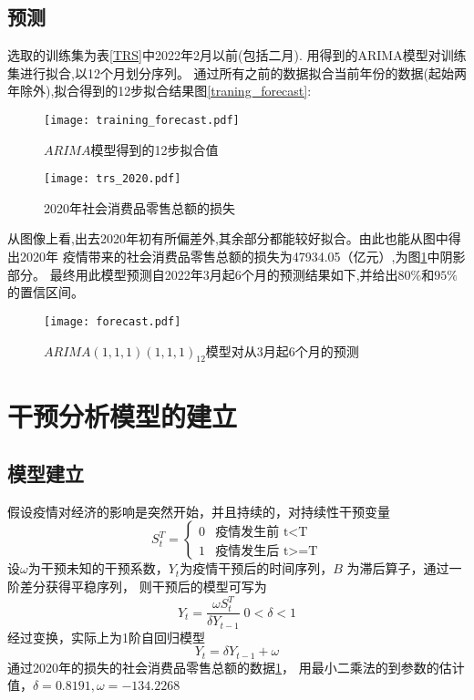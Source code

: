 \documentclass[12pt,a4paper]{nmmcm}
\begin{document}
  \subsection{预测}
  选取的训练集为表\ref{TRS}中2022年2月以前(包括二月).
  用得到的ARIMA模型对训练集进行拟合,以12个月划分序列。
  通过所有之前的数据拟合当前年份的数据(起始两年除外),拟合得到的12步拟合结果图\ref{traning_forecast}:
  \begin{figure}[H] %
    \centering %
    \begin{minipage}[t]{0.48\textwidth}
      \centering
      \texttt{[image: training\_forecast.pdf]} %
      \caption{\small{\(ARIMA\)模型得到的12步拟合值}} %
      \label{traning_forecast} %
    \end{minipage}
    \begin{minipage}[t]{0.48\textwidth}
      \centering %
      \texttt{[image: trs\_2020.pdf]} %
      \caption{\small{2020年社会消费品零售总额的损失}} %
      \label{trs_2020} %
    \end{minipage}
  \end{figure} 
  从图像上看,出去2020年初有所偏差外,其余部分都能较好拟合。由此也能从图中得出2020年
  疫情带来的社会消费品零售总额的损失为47934.05（亿元）,为图\ref{trs_2020}中阴影部分。
  最终用此模型预测自2022年3月起6个月的预测结果如下,并给出\(80\% \text{和}95\%\)的置信区间。
  \begin{figure}[H] %
    \centering %
    \texttt{[image: forecast.pdf]} %
    \caption{\(ARIMA(1,1,1)(1,1,1)_{12}\)模型对从3月起6个月的预测} %
    \label{forecast} %
  \end{figure} 
  \section{干预分析模型的建立}
  \subsection{模型建立}
  假设疫情对经济的影响是突然开始，并且持续的，对持续性干预变量
  \[S_t^T = \begin{cases}
    0& \text{疫情发生前 t<T}\\
    1& \text{疫情发生后 t>=T}
  \end{cases}\]
  设\(\omega\)为干预未知的干预系数，\(Y_t\)为疫情干预后的时间序列，\(B\)
  为滞后算子，通过一阶差分获得平稳序列，
  则干预后的模型可写为
  \begin{equation}
      Y_t = \frac{\omega S_t^T}{\delta Y_{t-1}} \; 0<\delta<1
  \end{equation}
  经过变换，实际上为1阶自回归模型\[Y_t = \delta Y_{t-1} + \omega\]
  通过2020年的损失的社会消费品零售总额的数据\ref{trs_2020}，
  用最小二乘法的到参数的估计值，\(\delta = 0.8191 , \omega =  -134.2268 \)
\end{document}
